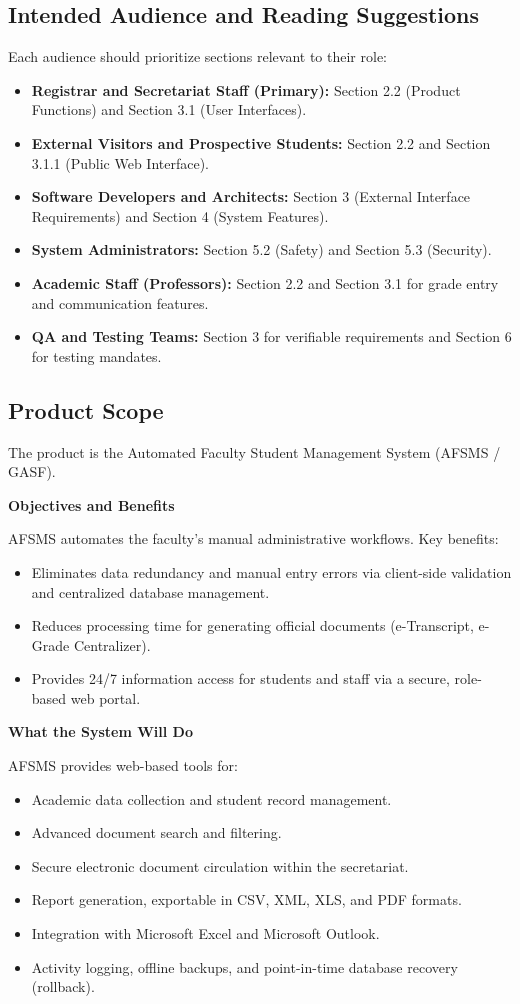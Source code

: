 \documentclass[11pt, a4paper]{article}
\begin{document}
\subsection{Intended Audience and Reading Suggestions}
Each audience should prioritize sections relevant to their role:
\begin{itemize}
    \item \textbf{Registrar and Secretariat Staff (Primary):} Section 2.2 (Product Functions) and Section 3.1 (User Interfaces).
    \item \textbf{External Visitors and Prospective Students:} Section 2.2 and Section 3.1.1 (Public Web Interface).
    \item \textbf{Software Developers and Architects:} Section 3 (External Interface Requirements) and Section 4 (System Features).
    \item \textbf{System Administrators:} Section 5.2 (Safety) and Section 5.3 (Security).
    \item \textbf{Academic Staff (Professors):} Section 2.2 and Section 3.1 for grade entry and communication features.
    \item \textbf{QA and Testing Teams:} Section 3 for verifiable requirements and Section 6 for testing mandates.
\end{itemize}

\subsection{Product Scope}
The product is the Automated Faculty Student Management System (AFSMS / GASF).

\textbf{Objectives and Benefits}

AFSMS automates the faculty's manual administrative workflows. Key benefits:
\begin{itemize}
    \item Eliminates data redundancy and manual entry errors via client-side validation and centralized database management.
    \item Reduces processing time for generating official documents (e-Transcript, e-Grade Centralizer).
    \item Provides 24/7 information access for students and staff via a secure, role-based web portal.
\end{itemize}

\textbf{What the System Will Do}

AFSMS provides web-based tools for:
\begin{itemize}
    \item Academic data collection and student record management.
    \item Advanced document search and filtering.
    \item Secure electronic document circulation within the secretariat.
    \item Report generation, exportable in CSV, XML, XLS, and PDF formats.
    \item Integration with Microsoft Excel and Microsoft Outlook.
    \item Activity logging, offline backups, and point-in-time database recovery (rollback).
\end{itemize}
\end{document}
